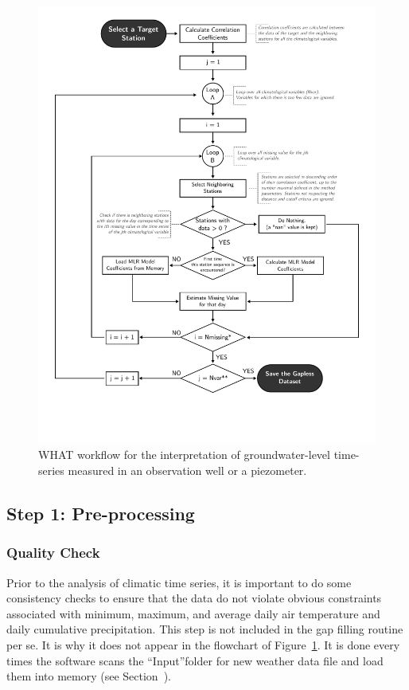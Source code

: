 \documentclass[WHATMANUAL.tex]{subfiles}
\begin{document}
\begin{figure}
\centering
\includegraphics[height=0.95\textheight]{img/Flowchart-filling_missing_weather}
\caption[WHAT workflow.]{WHAT workflow for the interpretation of groundwater-level time-series measured in an observation well or a piezometer.}
\label{fig:flowchart_GapFilling}
\end{figure}

\subsection{Step 1: Pre-processing}

\subsubsection{Quality Check}

Prior to the analysis of climatic time series, it is important to do some consistency checks to ensure that the data do not violate obvious constraints associated with minimum, maximum, and average daily air temperature and daily cumulative precipitation. This step is not included in the gap filling routine per se. It is why it does not appear in the flowchart of Figure~\ref{fig:flowchart_GapFilling}. It is done every times the software scans the ``Input''folder for new weather data file and load them into memory (see Section~\label{guide-gapfilling}).
\end{document}
